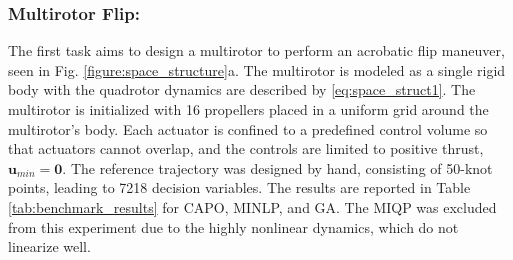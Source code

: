 \documentclass[runningheads]{llncs}
\begin{document}
\subsubsection{Multirotor Flip:}
The first task aims to design a multirotor to perform an acrobatic flip maneuver, seen in Fig. \ref{figure:space_structure}a. The multirotor is modeled as a single rigid body with the quadrotor dynamics are described by \eqref{eq:space_struct1}. The multirotor is initialized with 16 propellers placed in a uniform grid around the multirotor's body. Each actuator is confined to a predefined control volume so that actuators cannot overlap, and the controls are limited to positive thrust, $\textbf{u}_{min}=\textbf{0}$. The reference trajectory was designed by hand, consisting of 50-knot points, leading to 7218 decision variables. The results are reported in Table \ref{tab:benchmark_results} for CAPO, MINLP, and GA. The MIQP was excluded from this experiment due to the highly nonlinear dynamics, which do not linearize well. 
\end{document}
